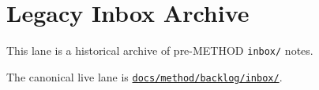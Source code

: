 \chapter{Legacy Inbox Archive}\label{record-390}

\smallskip

This lane is a historical archive of pre-METHOD \texttt{i\allowbreak{}n\allowbreak{}b\allowbreak{}o\allowbreak{}x\allowbreak{}/} notes.

The canonical live lane is \href{https://github.com/flyingrobots/bijou/blob/cbd70612140e7a450d764b3c7be1c6af878b99bc/docs/method/graveyard/method/backlog/inbox/README.md}{\texttt{d\allowbreak{}o\allowbreak{}c\allowbreak{}s\allowbreak{}/\allowbreak{}m\allowbreak{}e\allowbreak{}t\allowbreak{}h\allowbreak{}o\allowbreak{}d\allowbreak{}/\allowbreak{}b\allowbreak{}a\allowbreak{}c\allowbreak{}k\allowbreak{}l\allowbreak{}o\allowbreak{}g\allowbreak{}/\allowbreak{}i\allowbreak{}n\allowbreak{}b\allowbreak{}o\allowbreak{}x\allowbreak{}/}}.

